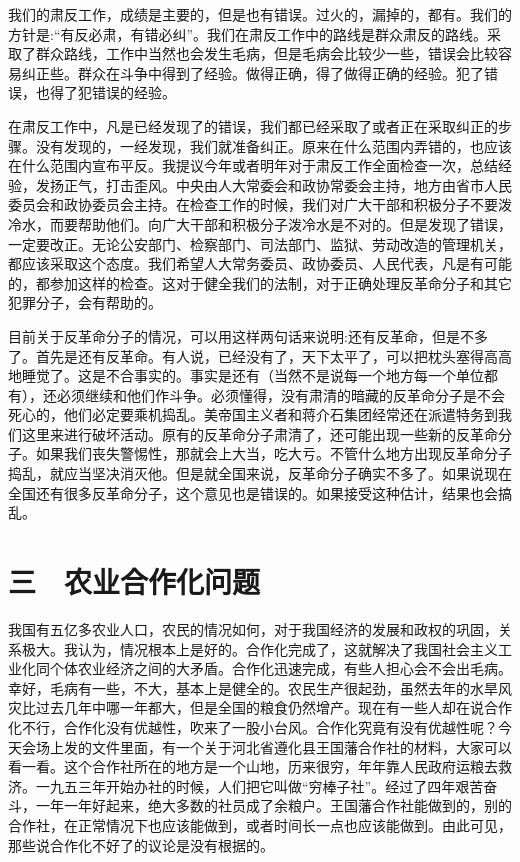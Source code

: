 我们的肃反工作，成绩是主要的，但是也有错误。过火的，漏掉的，都有。我们的方针是:“有反必肃，有错必纠”。我们在肃反工作中的路线是群众肃反的路线。采取了群众路线，工作中当然也会发生毛病，但是毛病会比较少一些，错误会比较容易纠正些。群众在斗争中得到了经验。做得正确，得了做得正确的经验。犯了错误，也得了犯错误的经验。

在肃反工作中，凡是已经发现了的错误，我们都已经采取了或者正在采取纠正的步骤。没有发现的，一经发现，我们就准备纠正。原来在什么范围内弄错的，也应该在什么范围内宣布平反。我提议今年或者明年对于肃反工作全面检查一次，总结经验，发扬正气，打击歪风。中央由人大常委会和政协常委会主持，地方由省市人民委员会和政协委员会主持。在检查工作的时候，我们对广大干部和积极分子不要泼冷水，而要帮助他们。向广大干部和积极分子泼冷水是不对的。但是发现了错误，一定要改正。无论公安部门、检察部门、司法部门、监狱、劳动改造的管理机关，都应该采取这个态度。我们希望人大常务委员、政协委员、人民代表，凡是有可能的，都参加这样的检查。这对于健全我们的法制，对于正确处理反革命分子和其它犯罪分子，会有帮助的。

目前关于反革命分子的情况，可以用这样两句话来说明:还有反革命，但是不多了。首先是还有反革命。有人说，已经没有了，天下太平了，可以把枕头塞得高高地睡觉了。这是不合事实的。事实是还有（当然不是说每一个地方每一个单位都有），还必须继续和他们作斗争。必须懂得，没有肃清的暗藏的反革命分子是不会死心的，他们必定要乘机捣乱。美帝国主义者和蒋介石集团经常还在派遣特务到我们这里来进行破坏活动。原有的反革命分子肃清了，还可能出现一些新的反革命分子。如果我们丧失警惕性，那就会上大当，吃大亏。不管什么地方出现反革命分子捣乱，就应当坚决消灭他。但是就全国来说，反革命分子确实不多了。如果说现在全国还有很多反革命分子，这个意见也是错误的。如果接受这种估计，结果也会搞乱。

\section{三　农业合作化问题}

我国有五亿多农业人口，农民的情况如何，对于我国经济的发展和政权的巩固，关系极大。我认为，情况根本上是好的。合作化完成了，这就解决了我国社会主义工业化同个体农业经济之间的大矛盾。合作化迅速完成，有些人担心会不会出毛病。幸好，毛病有一些，不大，基本上是健全的。农民生产很起劲，虽然去年的水旱风灾比过去几年中哪一年都大，但是全国的粮食仍然增产。现在有一些人却在说合作化不行，合作化没有优越性，吹来了一股小台风。合作化究竟有没有优越性呢？今天会场上发的文件里面，有一个关于河北省遵化县王国藩合作社的材料，大家可以看一看。这个合作社所在的地方是一个山地，历来很穷，年年靠人民政府运粮去救济。一九五三年开始办社的时候，人们把它叫做“穷棒子社”。经过了四年艰苦奋斗，一年一年好起来，绝大多数的社员成了余粮户。王国藩合作社能做到的，别的合作社，在正常情况下也应该能做到，或者时间长一点也应该能做到。由此可见，那些说合作化不好了的议论是没有根据的。

